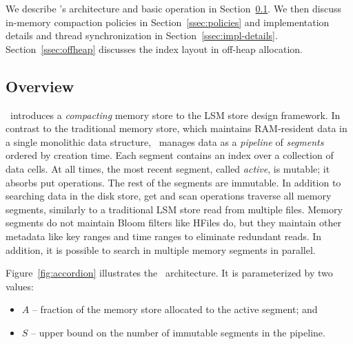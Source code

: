 
We describe  \sys's architecture and basic operation in Section~\ref{ssec:overview}.
We then discuss in-memory compaction policies  in  Section~\ref{ssec:policies}
and implementation details and thread synchronization in Section~\ref{ssec:impl-details}.
Section~\ref{ssec:offheap} discusses the   index layout in off-heap allocation.


\subsection{Overview} \label{ssec:overview}


\sys\ introduces a \emph{compacting} memory store to the LSM store design framework. In contrast to the traditional memory store, 
which maintains RAM-resident data in a single monolithic data structure, \sys\ manages data as a \emph{pipeline} of 
\emph{segments} ordered by creation time. Each segment contains an index over a collection of data cells.
At all times, the most recent segment, called \emph{active}, is mutable;
it absorbs put operations. The rest of the segments are immutable.  
%
In addition to searching data in the disk store, get and scan operations traverse all memory segments,  similarly to a traditional LSM store read from multiple files. 
Memory segments do not maintain Bloom filters like HFiles do, but they maintain other metadata like key ranges and time ranges to eliminate redundant reads. In addition, it is possible to search in multiple memory segments in parallel.
  
Figure~\ref{fig:accordion} illustrates the \sys\ architecture. It is parameterized by two values:
\begin{itemize}
\item  $A$ --  fraction of the memory store allocated to the active segment; and 
\item $S$ --  upper bound on the number of immutable segments in the pipeline. 
\end{itemize}

